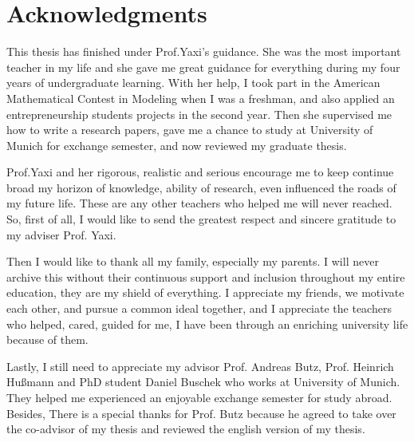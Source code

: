 \chapter*{Acknowledgments}

This thesis has finished under Prof.Yaxi's guidance. She was the most important teacher in my life and she gave me great guidance for everything during my four years of undergraduate learning.
With her help, I took part in the American Mathematical Contest in Modeling when I was a freshman, and also applied an entrepreneurship students projects in the second year. Then she supervised me how to write a research papers, gave me a chance to study at University of Munich for exchange semester, and now reviewed my graduate thesis.

Prof.Yaxi and her rigorous, realistic and serious encourage me to keep continue broad my horizon of knowledge, ability of research, even influenced the roads of my future life. These are any other teachers who helped me will never reached. So, first of all, I would like to send the greatest respect and sincere gratitude to my adviser Prof. Yaxi.

Then I would like to thank all my family, especially my parents. I will never archive this without their continuous support and inclusion throughout my entire education, they are my shield of everything.
I appreciate my friends, we motivate each other, and pursue a common ideal together, and I appreciate the teachers who helped, cared, guided for me, I have been through an enriching university life because of them.

Lastly, I still need to appreciate my advisor Prof. Andreas Butz, Prof. Heinrich Hußmann and PhD student Daniel Buschek who works at University of Munich. They helped me experienced an enjoyable exchange semester for study abroad. Besides, There is a special thanks for Prof. Butz because he agreed to take over the co-advisor of my thesis and reviewed the english version of my thesis.

